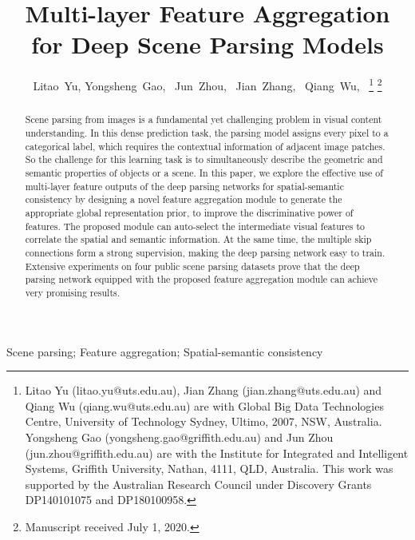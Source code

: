 \documentclass[10pt,twocolumn,twoside]{IEEEtran}
\begin{document}
\title{Multi-layer Feature Aggregation for Deep Scene Parsing Models}
\author{Litao~Yu, 
	Yongsheng~Gao,~
	Jun~Zhou,~
	Jian~Zhang,~
	Qiang~Wu,~
\thanks{Litao Yu (litao.yu@uts.edu.au), Jian Zhang (jian.zhang@uts.edu.au) and Qiang Wu (qiang.wu@uts.edu.au) are with Global Big Data Technologies Centre, University of Technology Sydney, Ultimo, 2007, NSW, Australia. Yongsheng Gao (yongsheng.gao@griffith.edu.au) and Jun Zhou (jun.zhou@griffith.edu.au) are with the Institute for Integrated and Intelligent Systems, Griffith University, Nathan, 4111, QLD, Australia.  This work was supported by the Australian Research Council under Discovery Grants DP140101075 and DP180100958.}
 \thanks{Manuscript received July 1, 2020.}
}
 
\maketitle
 

\begin{abstract}
Scene parsing from images is a fundamental yet challenging problem in visual content understanding. In this dense prediction task, the parsing model assigns every pixel to a categorical label, which requires the contextual information of adjacent image patches. So the challenge for this learning task is to simultaneously describe the geometric and semantic properties of objects or a scene. In this paper, we explore the effective use of multi-layer feature outputs of the deep parsing networks for spatial-semantic consistency by designing a novel feature aggregation module to generate the appropriate global representation prior, to improve the discriminative power of features. The proposed module can auto-select the intermediate visual features to correlate the spatial and semantic information. At the same time, the multiple skip connections form a strong supervision, making the deep parsing network easy to train. Extensive experiments on four public scene parsing datasets prove that the deep parsing network equipped with the proposed feature aggregation module can achieve very promising results.
\end{abstract}

\begin{IEEEkeywords}
Scene parsing; Feature aggregation; Spatial-semantic consistency
\end{IEEEkeywords}
\end{document}
